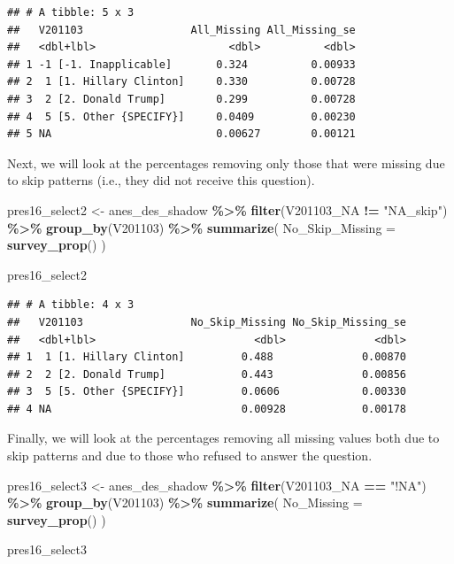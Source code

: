 \documentclass[
]{krantz}
\makeatletter
\newenvironment{Shaded}{\begin{snugshade}}{\end{snugshade}}
\newcommand{\AttributeTok}[1]{\textcolor[rgb]{0.27,0.27,0.27}{#1}}
\newcommand{\FunctionTok}[1]{\textcolor[rgb]{0.27,0.27,0.27}{\textbf{#1}}}
\newcommand{\NormalTok}[1]{#1}
\newcommand{\OtherTok}[1]{\textcolor[rgb]{0.37,0.37,0.37}{#1}}
\newcommand{\SpecialCharTok}[1]{\textcolor[rgb]{0.43,0.43,0.43}{\textbf{#1}}}
\newcommand{\StringTok}[1]{\textcolor[rgb]{0.5,0.5,0.5}{#1}}
\newenvironment{kframe}{%
\medskip{}
\setlength{\fboxsep}{.8em}
 \def\at@end@of@kframe{}%
 \ifinner\ifhmode%
  \def\at@end@of@kframe{\end{minipage}}%
  \begin{minipage}{\columnwidth}%
 \fi\fi%
 \def\FrameCommand##1{\hskip\@totalleftmargin \hskip-\fboxsep
 \colorbox{shadecolor}{##1}\hskip-\fboxsep
     \hskip-\linewidth \hskip-\@totalleftmargin \hskip\columnwidth}%
 \MakeFramed {\advance\hsize-\width
   \@totalleftmargin\z@ \linewidth\hsize
   \@setminipage}}%
 {\par\unskip\endMakeFramed%
 \at@end@of@kframe}
\renewenvironment{Shaded}{\begin{kframe}}{\end{kframe}}
\makeatother
\begin{document}
\begin{verbatim}
## # A tibble: 5 x 3
##   V201103                 All_Missing All_Missing_se
##   <dbl+lbl>                     <dbl>          <dbl>
## 1 -1 [-1. Inapplicable]       0.324          0.00933
## 2  1 [1. Hillary Clinton]     0.330          0.00728
## 3  2 [2. Donald Trump]        0.299          0.00728
## 4  5 [5. Other {SPECIFY}]     0.0409         0.00230
## 5 NA                          0.00627        0.00121
\end{verbatim}

Next, we will look at the percentages removing only those that were missing due to skip patterns (i.e., they did not receive this question).

\begin{Shaded}
\begin{Highlighting}[]
\NormalTok{pres16\_select2 }\OtherTok{\textless{}{-}}\NormalTok{ anes\_des\_shadow }\SpecialCharTok{\%\textgreater{}\%}
  \FunctionTok{filter}\NormalTok{(V201103\_NA }\SpecialCharTok{!=} \StringTok{"NA\_skip"}\NormalTok{) }\SpecialCharTok{\%\textgreater{}\%}
  \FunctionTok{group\_by}\NormalTok{(V201103) }\SpecialCharTok{\%\textgreater{}\%}
  \FunctionTok{summarize}\NormalTok{(}
    \AttributeTok{No\_Skip\_Missing =} \FunctionTok{survey\_prop}\NormalTok{()}
\NormalTok{  )}

\NormalTok{pres16\_select2}
\end{Highlighting}
\end{Shaded}

\begin{verbatim}
## # A tibble: 4 x 3
##   V201103                 No_Skip_Missing No_Skip_Missing_se
##   <dbl+lbl>                         <dbl>              <dbl>
## 1  1 [1. Hillary Clinton]         0.488              0.00870
## 2  2 [2. Donald Trump]            0.443              0.00856
## 3  5 [5. Other {SPECIFY}]         0.0606             0.00330
## 4 NA                              0.00928            0.00178
\end{verbatim}

Finally, we will look at the percentages removing all missing values both due to skip patterns and due to those who refused to answer the question.

\begin{Shaded}
\begin{Highlighting}[]
\NormalTok{pres16\_select3 }\OtherTok{\textless{}{-}}\NormalTok{ anes\_des\_shadow }\SpecialCharTok{\%\textgreater{}\%}
  \FunctionTok{filter}\NormalTok{(V201103\_NA }\SpecialCharTok{==} \StringTok{"!NA"}\NormalTok{) }\SpecialCharTok{\%\textgreater{}\%}
  \FunctionTok{group\_by}\NormalTok{(V201103) }\SpecialCharTok{\%\textgreater{}\%}
  \FunctionTok{summarize}\NormalTok{(}
    \AttributeTok{No\_Missing =} \FunctionTok{survey\_prop}\NormalTok{()}
\NormalTok{  )}

\NormalTok{pres16\_select3}
\end{Highlighting}
\end{Shaded}
\end{document}
